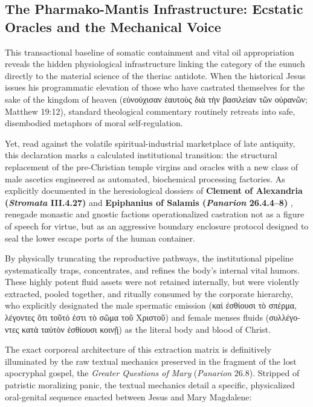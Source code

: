 \documentclass[11pt,twoside,a4paper]{article}
\begin{document}
\subsection{The Pharmako-Mantis Infrastructure: Ecstatic Oracles and the Mechanical Voice}

This transactional baseline of somatic containment and vital oil appropriation reveals the hidden physiological infrastructure linking the category of the eunuch directly to the material science of the theriac antidote. When the historical Jesus issues his programmatic elevation of those who have castrated themselves for the sake of the kingdom of heaven (\textgreek{εὐνούχισαν ἑαυτοὺς διὰ τὴν βασιλείαν τῶν οὐρανῶν}; Matthew 19:12), standard theological commentary routinely retreats into safe, disembodied metaphors of moral self-regulation. 

Yet, read against the volatile spiritual-industrial marketplace of late antiquity, this declaration marks a calculated institutional transition: the structural replacement of the pre-Christian temple virgins and oracles with a new class of male ascetics engineered as automated, biochemical processing factories. As explicitly documented in the heresiological dossiers of \textbf{Clement of Alexandria (\textit{Stromata} III.4.27)} \cite{stahlin1906clement} and \textbf{Epiphanius of Salamis (\textit{Panarion} 26.4.4--8)} \cite{holl1915epiphanius}, renegade monastic and gnostic factions operationalized castration not as a figure of speech for virtue, but as an aggressive boundary enclosure protocol designed to seal the lower escape ports of the human container. 

By physically truncating the reproductive pathways, the institutional pipeline systematically traps, concentrates, and refines the body's internal vital humors. These highly potent fluid assets were not retained internally, but were violently extracted, pooled together, and ritually consumed by the corporate hierarchy, who explicitly designated the male spermatic emission (\textgreek{καὶ ἐσθίουσι τὸ σπέρμα, λέγοντες ὅτι τοῦτό ἐστι τὸ σῶμα τοῦ Χριστοῦ}) and female menses fluids (\textgreek{συλλέγοντες κατὰ ταὐτὸν ἐσθίουσι κοινῇ}) as the literal body and blood of Christ. 

The exact corporeal architecture of this extraction matrix is definitively illuminated by 
the raw textual mechanics preserved in the fragment of the lost apocryphal gospel, the 
\textit{Greater Questions of Mary} (\textit{Panarion} 26.8). Stripped of patristic moralizing panic, 
the textual mechanics detail a specific, physicalized oral-genital sequence enacted between 
Jesus and Mary Magdalene: 
\end{document}
